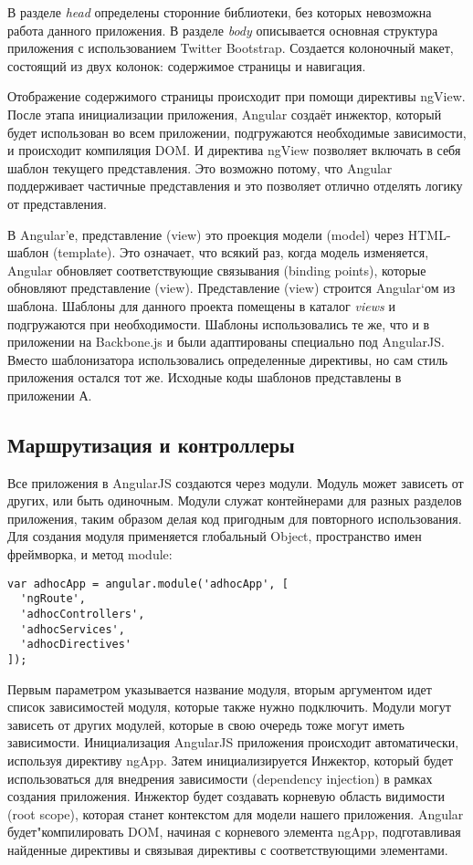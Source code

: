 В разделе \textit{head} определены сторонние библиотеки, без которых невозможна работа данного приложения. В разделе \textit{body} описывается основная структура приложения с использованием Twitter Bootstrap. Создается колоночный макет, состоящий из двух колонок: содержимое страницы и навигация.

Отображение содержимого страницы происходит при помощи директивы ngView. После этапа инициализации приложения, Angular создаёт инжектор, который будет использован во всем приложении, подгружаются необходимые зависимости, и происходит компиляция DOM. И директива ngView позволяет включать в себя шаблон текущего представления. Это возможно потому, что Angular поддерживает частичные представления и это позволяет отлично отделять логику от представления.

В Angular'е, представление (view) это проекция модели (model) через HTML-шаблон (template). Это означает, что всякий раз, когда модель изменяется, Angular обновляет соответствующие связывания (binding points), которые обновляют представление (view). Представление (view) строится Angular`ом из шаблона. Шаблоны для данного проекта помещены в каталог \textit{views} и подгружаются при необходимости. Шаблоны использовались те же, что и в приложении на Backbone.js и были адаптированы специально под AngularJS. Вместо шаблонизатора использовались определенные директивы, но сам стиль приложения остался тот же. Исходные коды шаблонов представлены в приложении А.

\subsection{Маршрутизация и контроллеры}

Все приложения в AngularJS создаются через модули. Модуль может зависеть от других, или быть одиночным. Модули служат контейнерами для разных разделов приложения, таким образом делая код пригодным для повторного использования. Для создания модуля применяется глобальный Object, пространство имен фреймворка, и метод module:
\begin{lstlisting}
var adhocApp = angular.module('adhocApp', [
  'ngRoute',
  'adhocControllers',
  'adhocServices',
  'adhocDirectives'
]);
\end{lstlisting}

Первым параметром указывается название модуля, вторым аргументом идет список зависимостей модуля, которые также нужно подключить. Модули могут зависеть от других модулей, которые в свою очередь тоже могут иметь зависимости.
Инициализация AngularJS приложения происходит автоматически, используя директиву ngApp. Затем инициализируется Инжектор, который будет использоваться для внедрения зависимости (dependency injection) в рамках создания приложения. Инжектор будет создавать корневую область видимости (root scope), которая станет контекстом для модели нашего приложения. Angular будет"компилировать DOM, начиная с корневого элемента ngApp, подготавливая найденные директивы и связывая директивы с соответствующими элементами\cite{angular:tutorial}.

